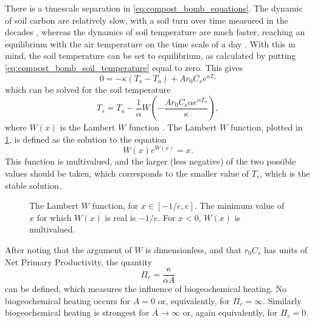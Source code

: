 There is a timescale separation in \cref{eq:compost_bomb_equations}. The dynamic of soil carbon are relatively slow, with a soil turn over time measured in the decades \parencite{Varney2022},
whereas the dynamics of soil temperature are much faster, reaching an equilibrium with the air temperature on the time scale of a day \parencite{Best2005}. With this in mind, the soil
temperature can be set to equilibrium, as calculated by putting \cref{eq:compost_bomb_soil_temperature} equal to zero. This gives
\begin{equation*}
  0 = - \kappa \left(T_s - T_a\right) + Ar_0C_se^{\alpha T_s}
\end{equation*}
which can be solved for the soil temperature
\begin{equation}
  \label{eq:soil_temperature_equilibrium}
  T_s = T_a - \frac{1}{\alpha} W\left(-\frac{Ar_0C_s \alpha e^{\alpha T_a}}{\kappa} \right),
\end{equation}
where $W(x)$ is the Lambert $W$ function \parencite{Corless1996}. The Lambert $W$ function, plotted in \cref{fig:lambert_W}, is defined as the solution to the equation
\begin{equation}
  \label{eq:lambert_W}
  W(x)e^{W(x)} = x.
\end{equation}
This function is multivalued, and the larger (less negative) of the two possible values should be taken, which corresponds to the smaller value of $T_s$, which is the stable solution.
\begin{figure}
  \centering
  \caption[The Lambert $W$ function]{The Lambert $W$ function, for $x \in [-1/e,e]$. The minimum value of $x$ for which $W(x)$ is real is $-1/e$. For $x < 0$, $W(x)$ is
  multivalued.}
  \label{fig:lambert_W}
\end{figure}

After noting that the argument of $W$ is dimensionless, and that $r_0C_s$ has units of Net Primary Productivity, the quantity 
\begin{equation}
  \label{eq:critical_npp}
  \Pi_c = \frac{\kappa}{\alpha A}
\end{equation}
can be defined, which measures the influence of biogeochemical heating. No biogeochemical heating occurs for $A = 0$ or, equivalently, for $\Pi_c = \infty$. Similarly
biogeochemical heating is strongest for $A \rightarrow \infty$ or, again equivalently, for $\Pi_c = 0$.

